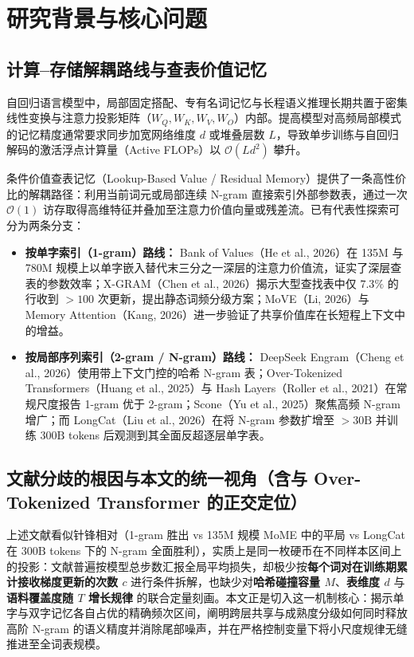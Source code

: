 \documentclass[10.5pt,a4paper]{ctexart}
\begin{document}
\begin{abstract}
\end{abstract}

\tableofcontents
\newpage

\section{研究背景与核心问题}

\subsection{计算--存储解耦路线与查表价值记忆}
自回归语言模型中，局部固定搭配、专有名词记忆与长程语义推理长期共置于密集线性变换与注意力投影矩阵（$W_Q, W_K, W_V, W_O$）内部。提高模型对高频局部模式的记忆精度通常要求同步加宽网络维度 $d$ 或堆叠层数 $L$，导致单步训练与自回归解码的激活浮点计算量（Active FLOPs）以 $\mathcal{O}(L d^2)$ 攀升。

条件价值查表记忆（Lookup-Based Value / Residual Memory）提供了一条高性价比的解耦路径：利用当前词元或局部连续 N-gram 直接索引外部参数表，通过一次 $\mathcal{O}(1)$ 访存取得高维特征并叠加至注意力价值向量或残差流。已有代表性探索可分为两条分支：
\begin{itemize}
    \item \textbf{按单字索引（1-gram）路线：} Bank of Values（He et al., 2026）在 135M 与 780M 规模上以单字嵌入替代末三分之一深层的注意力价值流，证实了深层查表的参数效率；X-GRAM（Chen et al., 2026）揭示大型查找表中仅 $7.3\%$ 的行收到 $>100$ 次更新，提出静态词频分级方案；MoVE（Li, 2026）与 Memory Attention（Kang, 2026）进一步验证了共享价值库在长短程上下文中的增益。
    \item \textbf{按局部序列索引（2-gram / N-gram）路线：} DeepSeek Engram（Cheng et al., 2026）使用带上下文门控的哈希 N-gram 表；Over-Tokenized Transformers（Huang et al., 2025）与 Hash Layers（Roller et al., 2021）在常规尺度报告 1-gram 优于 2-gram；Scone（Yu et al., 2025）聚焦高频 N-gram 增广；而 LongCat（Liu et al., 2026）在将 N-gram 参数扩增至 $>30\text{B}$ 并训练 $300\text{B}$ tokens 后观测到其全面反超逐层单字表。
\end{itemize}

\subsection{文献分歧的根因与本文的统一视角（含与 Over-Tokenized Transformer 的正交定位）}
上述文献看似针锋相对（1-gram 胜出 vs 135M 规模 MoME 中的平局 vs LongCat 在 $300\text{B}$ tokens 下的 N-gram 全面胜利），实质上是同一枚硬币在不同样本区间上的投影：文献普遍按模型总步数汇报全局平均损失，却极少按\textbf{每个词对在训练期累计接收梯度更新的次数 $c$} 进行条件拆解，也缺少对\textbf{哈希碰撞容量 $M$}、\textbf{表维度 $d$} 与 \textbf{语料覆盖度随 $T$ 增长规律} 的联合定量刻画。本文正是切入这一机制核心：揭示单字与双字记忆各自占优的精确频次区间，阐明跨层共享与成熟度分级如何同时释放高阶 N-gram 的语义精度并消除尾部噪声，并在严格控制变量下将小尺度规律无缝推进至全词表规模。
\end{document}
